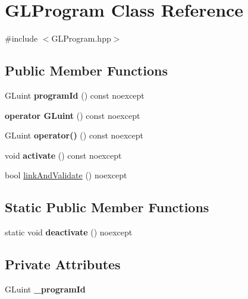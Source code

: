 \hypertarget{class_g_l_program}{}\section{G\+L\+Program Class Reference}
\label{class_g_l_program}


{\ttfamily \#include $<$G\+L\+Program.\+hpp$>$}

\subsection*{Public Member Functions}
\begin{DoxyCompactItemize}
\item 
\mbox{\label{class_g_l_program_afb05ccff898113f4a7be8a09de1472a0}} 
G\+Luint {\bfseries program\+Id} () const noexcept
\item 
\mbox{\label{class_g_l_program_a777a7576bbde3d97b8443d108377bc45}} 
{\bfseries operator G\+Luint} () const noexcept
\item 
\mbox{\label{class_g_l_program_a617c7f43397182ad205ffaf207b9de07}} 
G\+Luint {\bfseries operator()} () const noexcept
\item 
\mbox{\label{class_g_l_program_abe18e06eed9a729f4256d3efdc194966}} 
void {\bfseries activate} () const noexcept
\item 
bool \mbox{\hyperlink{class_g_l_program_a17292d63b8a7a6711ca75a1d3dfe9afa}{link\+And\+Validate}} () noexcept
\end{DoxyCompactItemize}
\subsection*{Static Public Member Functions}
\begin{DoxyCompactItemize}
\item 
\mbox{\label{class_g_l_program_a859e911d8783227ffb63f40d1e4dc344}} 
static void {\bfseries deactivate} () noexcept
\end{DoxyCompactItemize}
\subsection*{Private Attributes}
\begin{DoxyCompactItemize}
\item 
\mbox{\label{class_g_l_program_a7a58a961f07c62e34565bce46ab86731}} 
G\+Luint {\bfseries \+\_\+program\+Id}
\end{DoxyCompactItemize}


